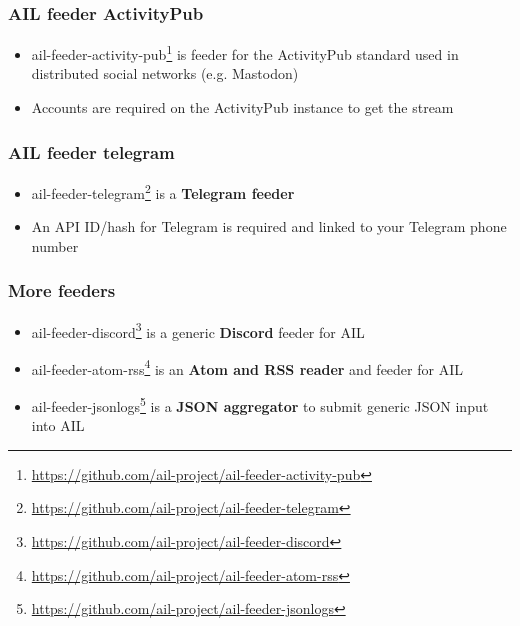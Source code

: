 \begin{frame}[fragile]
    \frametitle{AIL feeder ActivityPub}
    \begin{itemize}
        \item ail-feeder-activity-pub\footnote{\url{https://github.com/ail-project/ail-feeder-activity-pub}} is feeder for the ActivityPub standard used in distributed social networks (e.g. Mastodon)
        \item Accounts are required on the ActivityPub instance to get the stream
    \end{itemize}
\end{frame}

\begin{frame}[fragile]
    \frametitle{AIL feeder telegram}
    \begin{itemize}
        \item ail-feeder-telegram\footnote{\url{https://github.com/ail-project/ail-feeder-telegram}} is a {\bf Telegram feeder}
        \item An API ID/hash for Telegram is required and linked to your Telegram phone number
    \end{itemize}
\end{frame}

\begin{frame}[fragile]
    \frametitle{More feeders}
    \begin{itemize}
        \item ail-feeder-discord\footnote{\url{https://github.com/ail-project/ail-feeder-discord}} is a generic {\bf Discord} feeder for AIL
        \item ail-feeder-atom-rss\footnote{\url{https://github.com/ail-project/ail-feeder-atom-rss}} is an {\bf Atom and RSS reader} and feeder for AIL   
        \item ail-feeder-jsonlogs\footnote{\url{https://github.com/ail-project/ail-feeder-jsonlogs}} is a {\bf JSON aggregator} to submit generic JSON input into AIL
    \end{itemize}
\end{frame}


